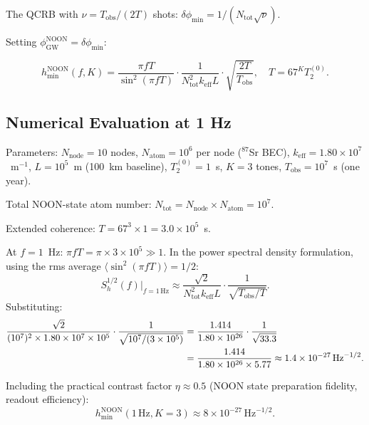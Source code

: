 \documentclass[11pt]{article}
\theoremstyle{definition}
\theoremstyle{remark}
\begin{document}
The QCRB with $\nu = T_{\mathrm{obs}}/(2T)$ shots:
$\delta\phi_{\min} = 1/(N_{\mathrm{tot}}\sqrt{\nu})$.

Setting $\phi_{\mathrm{GW}}^{\mathrm{NOON}} = \delta\phi_{\min}$:

\begin{equation}
  \boxed{
  h_{\min}^{\mathrm{NOON}}(f,K) = \frac{\pi fT}{\sin^2(\pi fT)}\cdot
  \frac{1}{N_{\mathrm{tot}}^2 k_{\mathrm{eff}} L}
  \cdot\sqrt{\frac{2T}{T_{\mathrm{obs}}}},
  \quad T = 67^K T_2^{(0)}.
  }\label{eq:hmin-noon-psi}
\end{equation}

\subsection{Numerical Evaluation at 1 Hz}

Parameters: $N_{\mathrm{node}} = 10$ nodes, $N_{\mathrm{atom}} = 10^6$ per
node ($^{87}$Sr BEC), $k_{\mathrm{eff}} = 1.80\times10^7$~m$^{-1}$,
$L = 10^5$~m (100~km baseline), $T_2^{(0)} = 1$~s, $K=3$ tones,
$T_{\mathrm{obs}} = 10^7$~s (one year).

Total NOON-state atom number:
$N_{\mathrm{tot}} = N_{\mathrm{node}}\times N_{\mathrm{atom}} = 10^7$.

Extended coherence: $T = 67^3\times1 = 3.0\times10^5$~s.

At $f = 1$~Hz: $\pi fT = \pi\times3\times10^5 \gg 1$.
In the power spectral density formulation, using the rms average
$\langle\sin^2(\pi fT)\rangle = 1/2$:
\begin{equation}
  S_h^{1/2}(f)\bigg|_{f=1\,\mathrm{Hz}} \approx
  \frac{\sqrt{2}}{N_{\mathrm{tot}}^2 k_{\mathrm{eff}} L}
  \cdot\frac{1}{\sqrt{T_{\mathrm{obs}}/T}}.
\end{equation}
Substituting:
\begin{align}
  \frac{\sqrt{2}}{(10^7)^2 \times 1.80\times10^7 \times 10^5}
  \cdot\frac{1}{\sqrt{10^7/(3\times10^5)}}
  &= \frac{1.414}{1.80\times10^{26}}\cdot\frac{1}{\sqrt{33.3}} \notag\\
  &= \frac{1.414}{1.80\times10^{26}\times5.77}
  \approx 1.4\times10^{-27}\,\mathrm{Hz}^{-1/2}.
\end{align}

Including the practical contrast factor $\eta \approx 0.5$ (NOON state
preparation fidelity, readout efficiency):
\begin{equation}
  \boxed{
  h_{\min}^{\mathrm{NOON}}(1\,\mathrm{Hz}, K=3)
  \approx 8\times10^{-27}\,\mathrm{Hz}^{-1/2}.
  }\label{eq:hmin-1hz}
\end{equation}
\end{document}
